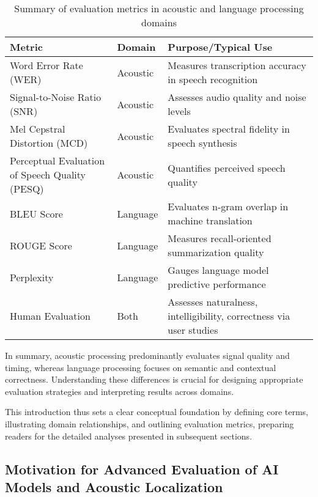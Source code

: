 \documentclass[sigconf]{acmart}
\begin{document}
\begin{table*}[htbp]
\centering
\caption{Summary of evaluation metrics in acoustic and language processing domains}
\label{tab:evaluation_metrics}
\begin{adjustbox}{max width=\textwidth}
\begin{tabular}{@{}lll@{}}
\toprule
\textbf{Metric} & \textbf{Domain} & \textbf{Purpose/Typical Use} \\ \midrule
Word Error Rate (WER) & Acoustic & Measures transcription accuracy in speech recognition \\
Signal-to-Noise Ratio (SNR) & Acoustic & Assesses audio quality and noise levels \\
Mel Cepstral Distortion (MCD) & Acoustic & Evaluates spectral fidelity in speech synthesis \\
Perceptual Evaluation of Speech Quality (PESQ) & Acoustic & Quantifies perceived speech quality \\
BLEU Score & Language & Evaluates n-gram overlap in machine translation \\
ROUGE Score & Language & Measures recall-oriented summarization quality \\
Perplexity & Language & Gauges language model predictive performance \\
Human Evaluation & Both & Assesses naturalness, intelligibility, correctness via user studies \\ \bottomrule
\end{tabular}
\end{adjustbox}
\end{table*}

In summary, acoustic processing predominantly evaluates signal quality and timing, whereas language processing focuses on semantic and contextual correctness. Understanding these differences is crucial for designing appropriate evaluation strategies and interpreting results across domains.

This introduction thus sets a clear conceptual foundation by defining core terms, illustrating domain relationships, and outlining evaluation metrics, preparing readers for the detailed analyses presented in subsequent sections.

\subsection{Motivation for Advanced Evaluation of AI Models and Acoustic Localization}
\end{document}

